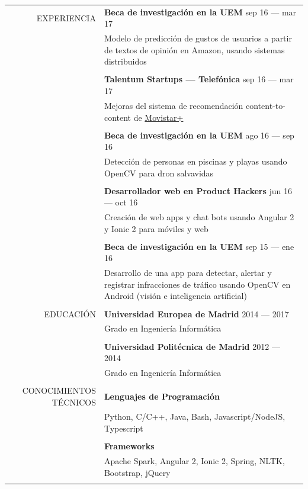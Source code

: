 \documentclass[a4paper, 11pt]{article}
\begin{document}
\begin{longtable}{rp{11cm}}
    EXPERIENCIA
    & {\bf Beca de investigación en la UEM} \hfill sep 16 --- mar 17\\
    & Modelo de predicción de gustos de usuarios a partir de textos de opinión en Amazon, usando sistemas distribuidos\\
    \\
    & {\bf Talentum Startups --- Telefónica} \hfill sep 16 --- mar 17\\
    & Mejoras del sistema de recomendación content-to-content de \href{http://ver.movistarplus.es/}{Movistar+}\\
    \\
    & {\bf Beca de investigación en la UEM} \hfill ago 16 --- sep 16\\
    & Detección de personas en piscinas y playas usando OpenCV para dron salvavidas\\
    \\
    & {\bf Desarrollador web en Product Hackers} \hfill jun 16 --- oct 16\\
    & Creación de web apps y chat bots usando Angular 2 y Ionic 2 para móviles y web\\
    \\
    & {\bf Beca de investigación en la UEM} \hfill sep 15 --- ene 16\\
    & Desarrollo de una app para detectar, alertar y registrar infracciones de tráfico usando OpenCV en Android (visión e inteligencia artificial)\\
    \\
    EDUCACIÓN
    & {\bf Universidad Europea de Madrid} \hfill 2014 --- 2017\\
    & Grado en Ingeniería Informática\\
    \\
    & {\bf Universidad Politécnica de Madrid} \hfill 2012 --- 2014\\
    & Grado en Ingeniería Informática\\
    \\
    CONOCIMIENTOS TÉCNICOS
    & {\bf Lenguajes de Programación}\\
    & Python, C/C++, Java, Bash, Javascript/NodeJS, Typescript\\
    \\
    & {\bf Frameworks}\\
    & Apache Spark, Angular 2, Ionic 2, Spring, NLTK, Bootstrap, jQuery\\
    \\

\end{longtable}
\end{document}
